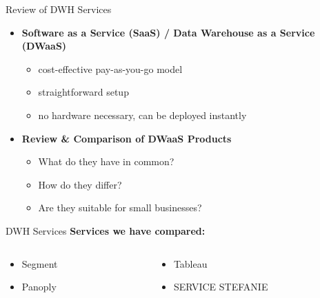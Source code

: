 \documentclass[aspectratio=169]{beamer}
\begin{document}
  \begin{frame}{Review of DWH Services}
    \begin{itemize}
      \item \textbf{Software as a Service (SaaS) / Data Warehouse as a Service (DWaaS)}
      	\begin{itemize}
      	   \item cost-effective pay-as-you-go model
           \item straightforward setup
           \item no hardware necessary, can be deployed instantly
      	\end{itemize}
      \item \textbf{Review \& Comparison of DWaaS Products}
        \begin{itemize}
           \item What do they have in common?
      	   \item How do they differ?
      	   \item Are they suitable for small businesses?
      	\end{itemize}
    \end{itemize}
  \end{frame}

  \begin{frame}{DWH Services}
    \textbf{Services we have compared:}

    \begin{columns}
      \begin{column}{0.5\textwidth}
        \begin{itemize}
          \item Segment
          \item Panoply
        \end{itemize}
      \end{column}

      \begin{column}{0.5\textwidth}
        \begin{itemize}
          \item Tableau
          \item SERVICE STEFANIE
        \end{itemize}
      \end{column}
    \end{columns}
  \end{frame}
\end{document}
